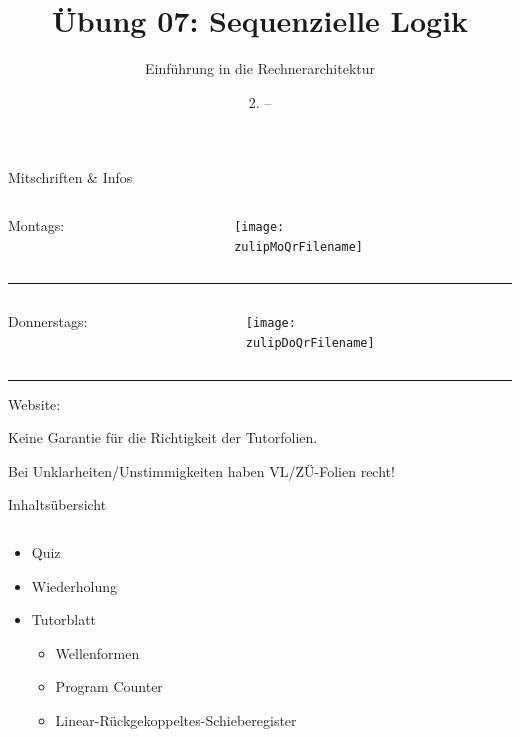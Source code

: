 \documentclass[
  german,            %
  aspectratio=169,    %
]{tumbeamer}
\title{Übung 07: Sequenzielle Logik}
\subtitle{Einführung in die Rechnerarchitektur}
\author{\theAuthorName}
\institute{\theGroupName\\\theSchoolName\\\theUniversityName}
\date{2. -- \DTMdisplaydate{2024}{12}{8}{-1}}
\begin{document}
\maketitle

\begin{frame}[c]{Mitschriften \& Infos}{}
  \begin{minipage}[t]{\textwidth}
    \begin{columns}[c]
      \begin{column}{0.8\textwidth}
        Montags: \href{\zulipMo}{\zulipMo}
      \end{column}
      \begin{column}{0.2\textwidth}
        \texttt{[image: \\zulipMoQrFilename]}
      \end{column}
    \end{columns}
  \end{minipage}
  \rule{\textwidth}{0.4pt}
  \begin{minipage}[t]{\textwidth}
    \begin{columns}[c]
      \begin{column}{0.8\textwidth}
        Donnerstags: \href{\zulipDo}{\zulipDo}
      \end{column}
      \begin{column}{0.2\textwidth}
        \texttt{[image: \\zulipDoQrFilename]}
      \end{column}
    \end{columns}
  \end{minipage}
  \ifdefined\myWebsite
  \rule{\textwidth}{0.4pt}
  \centering
  Website: \href{\myWebsite}{\myWebsite}
  \fi
\end{frame}

\begin{frame}[c]{}{}
  \begin{center}
    \LARGE  Keine Garantie für die Richtigkeit der Tutorfolien.

    \Large Bei Unklarheiten/Unstimmigkeiten haben VL/ZÜ-Folien recht!
  \end{center}
\end{frame}

\begin{frame}[c]{Inhaltsübersicht}{}
  \begin{columns}[c]
    \begin{column}{1\textwidth}
      \begin{itemize}
        \item Quiz
        \item Wiederholung
        \item Tutorblatt
        \begin{itemize}
          \item Wellenformen
          \item Program Counter
          \item Linear-Rückgekoppeltes-Schieberegister
        \end{itemize}
      \end{itemize}
    \end{column}
  \end{columns}
\end{frame}
\end{document}
